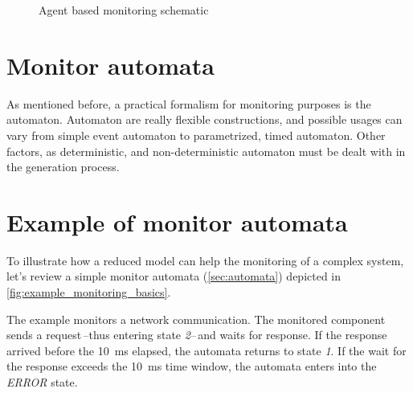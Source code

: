 \begin{figure}[h]
	\centering

	\caption{Agent based monitoring schematic}
\label{fig:agent_based_monitoring}
\end{figure}

\section{Monitor automata}

As mentioned before, a practical formalism for monitoring purposes is the automaton. Automaton are really flexible constructions, and possible usages can vary from simple event automaton to parametrized, timed automaton. Other factors, as deterministic, and non-deterministic automaton must be dealt with in the generation process.

\section{Example of monitor automata}

To illustrate how a reduced model can help the monitoring of a complex system, let's review a simple monitor automata (\cref{sec:automata}) depicted in \cref{fig:example_monitoring_basics}.

The example monitors a network communication. The monitored component sends a request\,--thus entering state \emph{2}--\,and waits for response. If the response arrived before the \qty{10}{\ms} elapsed, the automata returns to state \emph{1}. If the wait for the response exceeds the \qty{10}{ms} time window, the automata enters into the \emph{ERROR} state.

